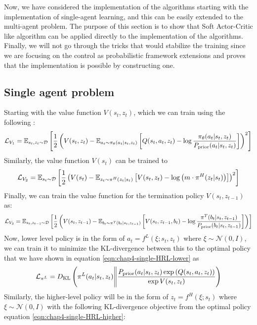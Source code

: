 Now, we have considered the implementation of the algorithms starting with the implementation of single-agent learning, and this can be easily extended to the multi-agent problem. The purpose of this section is to show that Soft Actor-Critic like algorithm can be applied directly to the implementation of the algorithms. Finally, we will not go through the tricks that would stabilize the training since we are focusing on the control as probabilistic framework extensions and proves that the implementation is possible by constructing one.
 
\subsection{Single agent problem}
Starting with the value function $V(s_t, z_t)$, which we can train using the following :
\begin{equation}
    \mathcal{L}_{V_1} = \mathbb{E}_{s_t, z_t \sim \mathcal{D}} \left[ \frac{1}{2}\left( V(s_t, z_t) - \mathbb{E}_{a_t \sim \pi_\theta(a_t | s_t, z_t)}\left[ Q(s_t, a_t, z_t) - \log \frac{\pi_\theta(a_t | s_t, z_t)}{P_{\text{prior}}(a_t | s_t, z_t)} \right] \right)^2 \right]
\end{equation}
Similarly, the value function $V(s_t)$ can be trained to 
\begin{equation}
    \mathcal{L}_{V_2} = \mathbb{E}_{s_t \sim \mathcal{D}}\left[ \frac{1}{2}\left( V(s_t) - \mathbb{E}_{z_t \sim \pi^H(z_t | s_t)}\left[ V(s_t, z_t) - \log\left( m\cdot \pi^H(z_t | s_t) \right) \right] \right)^2 \right]
\end{equation}
Finally, we can train the value function for the termination policy $V(s_t, z_{t-1})$ as:
\begin{equation}
    \mathcal{L}_{V_3} = \mathbb{E}_{s_t, z_{t-1} \sim \mathcal{D}}\left[ \frac{1}{2}\left( V(s_t, z_{t-1}) - \mathbb{E}_{b_t \sim \pi^T(b_t | s_t, z_{t-1})}\left[  V(s_t, z_{t-1}, b_t) - \log \frac{\pi^T(b_t | s_t, z_{t-1})}{P_{\text{prior}}(b_t | s_t, z_{t-1})} \right]   \right) \right]
\end{equation}
Now, lower level policy is in the form of $a_t = f^L(\xi ; s_t, z_t)$ where $\xi \sim \mathcal{N}(0, I)$, we can train it to minimize the KL-divergence between this to the optimal policy that we have shown in equation \ref{eqn:chap4-single-HRL-lower} as
\begin{equation}
    \mathcal{L}_{\pi^L} = D_{\mathrm{KL}}\left( \pi^L(a_t | s_t, z_t) \Bigg\| \frac{P_{\text{prior}}(a_{t} | s_{t}, z_{t})\exp\left( Q(s_{t}, a_{t}, z_{t}) \right)}{\exp V(s_{t}, z_{t})} \right)
\end{equation}
Similarly, the higher-level policy will be in the form of $z_t = f^H(\xi ; s_t)$ where $\xi \sim \mathcal{N}(0, I)$ with the following KL-divergence objective from the optimal policy equation \ref{eqn:chap4-single-HRL-higher}:
